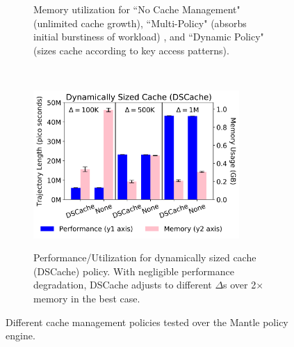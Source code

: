 \begin{figure}[t!]
\begin{subfigure}[t]{0.32\textwidth}
	\caption{Memory utilization for ``No Cache Management" (unlimited cache
growth), ``Multi-Policy" (absorbs initial burstiness of workload) , and
``Dynamic Policy" (sizes cache according to key access patterns).
\label{fig:memory-vs-time}}
    \end{subfigure}%
    ~
    \begin{subfigure}[t]{0.32\textwidth}
        \centering
        \includegraphics[width=0.86\textwidth]{figures/dscache-vs-none.png}\\
	\caption{Performance/Utilization for dynamically sized cache (DSCache)
policy. With negligible performance degradation, DSCache adjusts to different
\(\Delta\)s over 2\(\times\) memory in the best case.
\label{fig:dscache-vs-none}}
    \end{subfigure}%
    \caption{Different cache management policies tested over the Mantle policy engine.}
\end{figure}

